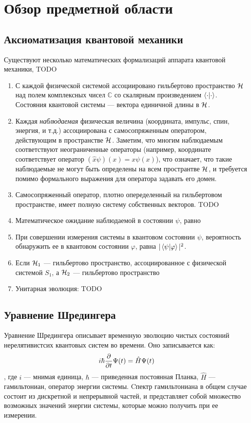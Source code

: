 \chapter{Обзор предметной области}
\label{chapter1}

\section{Аксиоматизация квантовой механики}


Существуют несколько математических формализаций аппарата квантовой механики, TODO

\begin{enumerate}
\item С каждой физической системой ассоциировано гильбертово пространство $\mathcal{H}_{}$ над полем комплексных чисел $\mathbb{C}$ со скалярным произведением $\ip{\cdot}{\cdot}$. Состояния квантовой системы — вектора единичной длины в $\mathcal{H}_{}$.
\item Каждая \textit{наблюдаемая} физическая величина (координата, импульс, спин, энергия, и т.д.) ассоциирована с самосопряженным оператором, действующим в пространстве $\mathcal{H}_{}$. Заметим, что многим наблюдаемым соответствуют неограниченные операторы (например, координате соответствует оператор $(\hat{x} \psi)(x) = x \psi(x)$), что означает, что такие наблюдаемые не могут быть определены на всем пространтве $\mathcal{H}_{}$, и требуется помимо формального выражения для оператора задавать его домен.
\item Самосопряженный оператор, плотно опеределенный на гильбертовом пространстве, имеет полную систему собственных векторов. TODO
\item Математическое ожидание наблюдаемой в состоянии $\psi$, равно 
\item При совершении измерения системы в квантовом состоянии $\psi$, вероятность обнаружить ее в квантовом состоянии $\varphi$, равна $|\ip{\psi}{\varphi}|^2$.
\item Если $\mathcal{H}_{1}$ — гильбертово пространство, ассоциированное с физической системой $S_1$, а $\mathcal{H}_{2}$ — гильбертово пространство
\item Унитарная эволюция: TODO
\end{enumerate}

\section{Уравнение Шредингера}
Уравнение Шредингера описывает временную эволюцию чистых состояний нерелятивистсих квантовых систем во времени. Оно записывается как:
\[
i \hbar \pdv{t} \Psi(t) = \hat{H} \Psi(t)
\]
, где $i$ — мнимая единица, $\hbar$ — приведенная постоянная Планка, $\hat{H}$ — гамильтониан, оператор энергии системы. Cпектр гамильтониана в общем случае состоит из дискретной и непрерывной частей, и представляет собой множество возможных значений энергии системы, которые можно получить при ее измерении.

